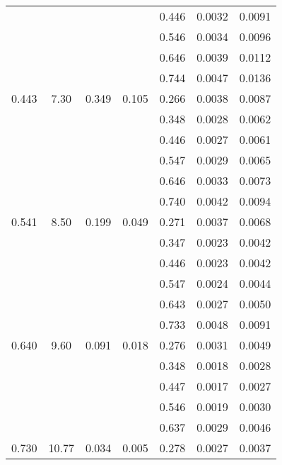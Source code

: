 \begin{table}[htbp]
\begin{center}
\begin{tabular}{|ccccc||c|c|}
         &          &          &          &    0.446 &    0.0032 &    0.0091 \\
         &          &          &          &    0.546 &    0.0034 &    0.0096 \\
         &          &          &          &    0.646 &    0.0039 &    0.0112 \\
         &          &          &          &    0.744 &    0.0047 &    0.0136 \\
   0.443 &    7.30 &   0.349 &    0.105 &    0.266 &    0.0038 &    0.0087 \\
         &          &          &          &    0.348 &    0.0028 &    0.0062 \\
         &          &          &          &    0.446 &    0.0027 &    0.0061 \\
         &          &          &          &    0.547 &    0.0029 &    0.0065 \\
         &          &          &          &    0.646 &    0.0033 &    0.0073 \\
         &          &          &          &    0.740 &    0.0042 &    0.0094 \\
   0.541 &    8.50 &   0.199 &    0.049 &    0.271 &    0.0037 &    0.0068 \\
         &          &          &          &    0.347 &    0.0023 &    0.0042 \\
         &          &          &          &    0.446 &    0.0023 &    0.0042 \\
         &          &          &          &    0.547 &    0.0024 &    0.0044 \\
         &          &          &          &    0.643 &    0.0027 &    0.0050 \\
         &          &          &          &    0.733 &    0.0048 &    0.0091 \\
   0.640 &    9.60 &   0.091 &    0.018 &    0.276 &    0.0031 &    0.0049 \\
         &          &          &          &    0.348 &    0.0018 &    0.0028 \\
         &          &          &          &    0.447 &    0.0017 &    0.0027 \\
         &          &          &          &    0.546 &    0.0019 &    0.0030 \\
         &          &          &          &    0.637 &    0.0029 &    0.0046 \\
   0.730 &   10.77 &   0.034 &    0.005 &    0.278 &    0.0027 &    0.0037 \\

\end{tabular}
\end{center}
\end{table}
